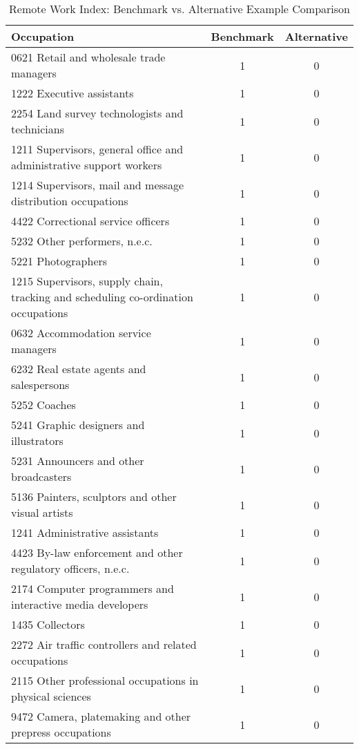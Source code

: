 \begin{table}[ht]
\centering
\caption{Remote Work Index: Benchmark vs. Alternative Example Comparison} 
\label{tab:remote_work_index_comparison}
\begin{tabular}{lcc}
  \hline
Occupation & Benchmark & Alternative \\ 
  \hline
0621 Retail and wholesale trade managers &   1 &   0 \\ 
  1222 Executive assistants &   1 &   0 \\ 
  2254 Land survey technologists and technicians &   1 &   0 \\ 
  1211 Supervisors, general office and administrative support workers &   1 &   0 \\ 
  1214 Supervisors, mail and message distribution occupations &   1 &   0 \\ 
  4422 Correctional service officers &   1 &   0 \\ 
  5232 Other performers, n.e.c. &   1 &   0 \\ 
  5221 Photographers &   1 &   0 \\ 
  1215 Supervisors, supply chain, tracking and scheduling co-ordination occupations &   1 &   0 \\ 
  0632 Accommodation service managers &   1 &   0 \\ 
  6232 Real estate agents and salespersons &   1 &   0 \\ 
  5252 Coaches &   1 &   0 \\ 
  5241 Graphic designers and illustrators &   1 &   0 \\ 
  5231 Announcers and other broadcasters &   1 &   0 \\ 
  5136 Painters, sculptors and other visual artists &   1 &   0 \\ 
  1241 Administrative assistants &   1 &   0 \\ 
  4423 By-law enforcement and other regulatory officers, n.e.c. &   1 &   0 \\ 
  2174 Computer programmers and interactive media developers &   1 &   0 \\ 
  1435 Collectors &   1 &   0 \\ 
  2272 Air traffic controllers and related occupations &   1 &   0 \\ 
  2115 Other professional occupations in physical sciences &   1 &   0 \\ 
  9472 Camera, platemaking and other prepress occupations &   1 &   0 \\ 

\end{tabular}
\end{table}

